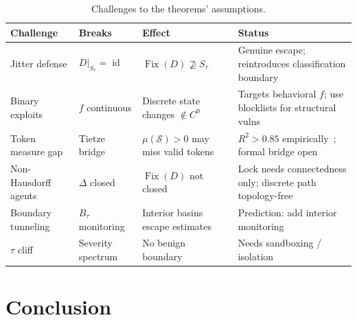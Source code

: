 \documentclass[11pt]{article}
\newcommand{\Fix}{\operatorname{Fix}}
\newcommand{\id}{\operatorname{id}}
\begin{document}
\begin{table}[!htbp]
\centering
\footnotesize
\setlength{\tabcolsep}{4pt}
\caption{Challenges to the theorems' assumptions.}
\label{tab:challenges}
\begin{tabular}{@{}p{3.4cm}p{3cm}p{4cm}p{4cm}@{}}
\toprule
\textbf{Challenge} & \textbf{Breaks} & \textbf{Effect} & \textbf{Status} \\
\midrule
Jitter defense
  & $D|_{S_\tau}\!=\!\id$
  & $\Fix(D)\!\not\supseteq\! S_\tau$
  & Genuine escape; reintroduces classification boundary \\[3pt]
Binary exploits
  & $f$ continuous
  & Discrete state changes $\notin C^0$
  & Targets behavioral $f$; use blocklists for structural vulns \\[3pt]
Token measure gap
  & Tietze bridge
  & $\mu(\mathcal{S})\!>\!0$ may miss valid tokens
  & $R^2\!>\!0.85$ empirically~\cite{munshi2026manifold}; formal bridge open \\[3pt]
Non-Hausdorff agents
  & $\Delta$ closed
  & $\Fix(D)$ not closed
  & Lock needs connectedness only; discrete path topology-free \\[3pt]
Boundary tunneling
  & $B_\tau$ monitoring
  & Interior basins escape estimates
  & Prediction: add interior monitoring \\[3pt]
$\tau$ cliff
  & Severity spectrum
  & No benign boundary
  & Needs sandboxing / isolation \\
\bottomrule
\end{tabular}
\end{table}

\section{Conclusion}
\label{sec:conclusion}
\end{document}
